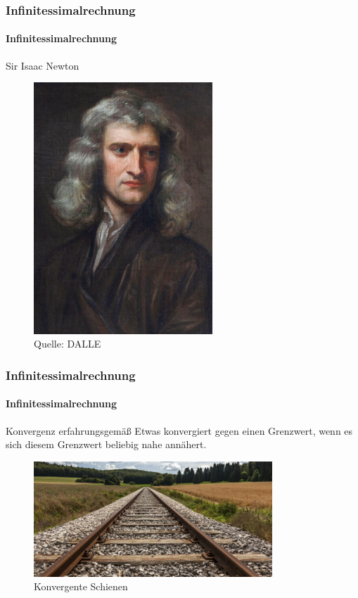 \documentclass{beamer}
\begin{document}
\begin{frame}
    \frametitle{Infinitessimalrechnung}
    \framesubtitle{Infinitessimalrechnung}
    \begin{block}{Sir Isaac Newton}
\begin{figure}[H]
      \centering
    \includegraphics[width=0.6\textwidth]{images/Newton.jpg}
      \caption{Quelle: DALLE}
\end{figure}

\end{block}

 \end{frame}




 \begin{frame}
    \frametitle{Infinitessimalrechnung}
\framesubtitle{Infinitessimalrechnung}
    \begin{block}{Konvergenz erfahrungsgemäß}
Etwas  konvergiert gegen einen Grenzwert, 
wenn es sich diesem Grenzwert beliebig nahe annähert.
\end{block}

    \begin{figure}[H]
          \centering
        \includegraphics[width=0.8\textwidth]{images/limit}
          \caption{Konvergente Schienen}
    \end{figure}

\end{frame}
\end{document}

